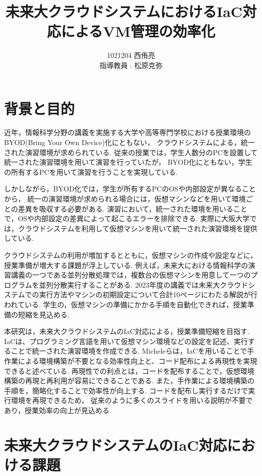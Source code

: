 \documentclass[11pt]{ujarticle}\sloppy
\author{%
1021204 西侑亮\\指導教員 : 松原克弥
}
\title{未来大クラウドシステムにおけるIaC対応によるVM管理の効率化}
\begin{document}
\maketitle


\section{背景と目的}
\label{sec:intro}
近年，情報科学分野の講義を実施する大学や高等専門学校における授業環境のBYOD(Bring Your Own Device)化\cite{byod}にともない，
クラウドシステムによる，統一された演習環境が求められている.
従来の授業では，学生人数分のPCを設置して統一された演習環境を用いて演習を行っていたが，
BYOD化にともない，学生の所有するPCを用いて演習を行うことを実現している.


しかしながら，BYOD化では，学生が所有するPCのOSや内部設定が異なることから，
統一の演習環境が求められる場合には，仮想マシンなどを用いて環境ごとの差異を吸収する必要がある.
演習において，統一された環境を用いることで，OSや内部設定の差異によって起こるエラーを排除できる.
実際に大阪大学では，クラウドシステムを利用して仮想マシンを用いて統一された演習環境を提供している\cite{oosakadai}.


クラウドシステムの利用が増加するとともに，仮想マシンの作成や設定などに，
授業準備が増大する課題が浮上している.
例えば，未来大における情報科学の演習講義の一つである並列分散処理では，複数台の仮想マシンを用意して一つのプログラムを並列分散実行することがある.
2023年度の講義では未来大クラウドシステムでの実行方法やマシンの初期設定について合計10ページにわたる解説が行われている.
学生の，仮想マシンの準備にかかる手順を自動化できれば，授業準備の短縮を見込める.


本研究は，未来大クラウドシステムのIaC対応による，授業準備短縮を目指す.
IaCは、プログラミング言語を用いて仮想マシン環境などの設定を記述、実行することで統一された演習環境を作成できる\cite{O'Reilly Media}.
Micheleら\cite{InformationSystem}は，IaCを用いることで手作業による環境構築が不要となる効率性向上と、コード配布による再現性を実現できると述べている.
再現性での利点とは，コードを配布することで，仮想環境構築の再現と再利用が容易にできることである.
また，手作業による環境構築の手順を，簡略化することで効率性が向上する.
コードを配布し実行するだけで実行環境を再現できるため，
従来のように多くのスライドを用いる説明が不要であり，授業効率の向上が見込める.


\section{未来大クラウドシステムのIaC対応における課題}
\end{document}
